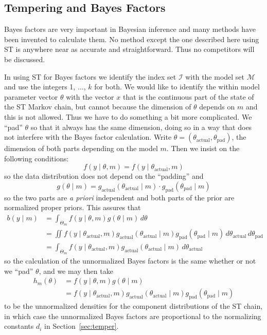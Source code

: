 \documentclass[11pt]{article}
\begin{document}
\subsection{Tempering and Bayes Factors}

Bayes factors are very important in Bayesian inference and many methods have
been invented to calculate them.  No method except the one described here
using ST is anywhere near as accurate and straightforward.  Thus no competitors
will be discussed.

In using ST for Bayes factors we identify the index set $\mathcal{I}$ with
the model set $\mathcal{M}$ and use the integers 1, $\ldots$, $k$ for both.
We would like to identify the within model parameter vector $\theta$ with
the vector $x$ that is the continuous part of the state of the ST Markov
chain, but cannot because the dimension of $\theta$ depends on $m$ and this
is not allowed.  Thus we have to do something a bit more complicated.  We
``pad'' $\theta$ so that it always has the same dimension, doing so in
a way that does not interfere with the Bayes factor calculation.  Write
$\theta = (\theta_{\text{actual}}, \theta_{\text{pad}})$, the dimension
of both parts depending on the model $m$.  Then we insist on the following
conditions:
$$
   f(y \mid \theta, m) = f(y \mid \theta_{\text{actual}}, m)
$$
so the data distribution does not depend on the ``padding'' and
$$
   g(\theta \mid m) = g_{\text{actual}}(\theta_{\text{actual}} \mid m)
   \cdot g_{\text{pad}}(\theta_{\text{pad}} \mid m)
$$
so the two parts are \emph{a priori} independent and both parts of the prior
are normalized proper priors.  This assures that
\begin{equation} \label{eq:unnormalized-bayes-factors}
\begin{split}
   b(y \mid m)
   & =
   \int_{\Theta_m} f(y \mid \theta, m) g(\theta \mid m) \, d \theta
   \\
   & =
   \iint f(y \mid \theta_{\text{actual}}, m)
   g_{\text{actual}}(\theta_{\text{actual}} \mid m)
   g_{\text{pad}}(\theta_{\text{pad}} \mid m)
   \, d \theta_{\text{actual}}
   \, d \theta_{\text{pad}}
   \\
   & =
   \int_{\Theta_m} f(y \mid \theta_{\text{actual}}, m)
   g_{\text{actual}}(\theta_{\text{actual}} \mid m)
   \, d \theta_{\text{actual}}
\end{split}
\end{equation}
so the calculation of the unnormalized Bayes factors is the same whether
or not we ``pad'' $\theta$, and we may then take
\begin{align*}
   h_m(\theta)
   & = 
   f(y \mid \theta, m) g(\theta \mid m)
   \\
   & =
   f(y \mid \theta_{\text{actual}}, m)
   g_{\text{actual}}(\theta_{\text{actual}} \mid m)
   g_{\text{pad}}(\theta_{\text{pad}} \mid m)
\end{align*}
to be the unnormalized densities for the component distributions of the ST
chain, in which case the unnormalized Bayes factors are proportional to the
normalizing constants $d_i$ in Section~\ref{sec:temper}.
\end{document}
